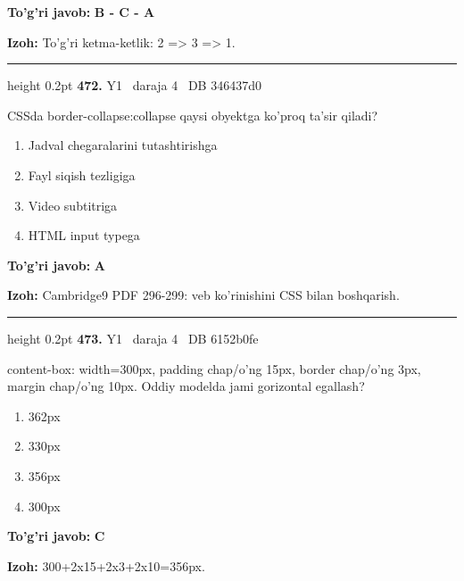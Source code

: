 \documentclass[10pt,a4paper,oneside]{article}
\begin{document}
\begin{tcolorbox}[enhanced,breakable,colback=teal!4,colframe=teal!45!black,boxrule=0.45pt,arc=1.2mm,left=2.8mm,right=2.8mm,top=2mm,bottom=2mm,before skip=2mm,after skip=2mm]
\textbf{\color{teal}To'g'ri javob:} \textbf{B - C - A}
\par\smallskip
\textbf{Izoh:} To'g'ri ketma-ketlik: 2 =\textgreater{} 3 =\textgreater{} 1.
\end{tcolorbox}
\vspace{2mm}\hrule height 0.2pt \vspace{4mm}
\hypertarget{q472}{\textbf{\color{ink}472.}}  {\color{muted}\scriptsize Y1 \textbullet\ daraja 4 \textbullet\ DB 346437d0}
\par
CSSda border-collapse:collapse qaysi obyektga ko'proq ta'sir qiladi?
\begin{enumerate}[label=\Alph*),leftmargin=9mm]
\item Jadval chegaralarini tutashtirishga
\item Fayl siqish tezligiga
\item Video subtitriga
\item HTML input typega
\end{enumerate}
\begin{tcolorbox}[enhanced,breakable,colback=teal!4,colframe=teal!45!black,boxrule=0.45pt,arc=1.2mm,left=2.8mm,right=2.8mm,top=2mm,bottom=2mm,before skip=2mm,after skip=2mm]
\textbf{\color{teal}To'g'ri javob:} \textbf{A}
\par\smallskip
\textbf{Izoh:} Cambridge9 PDF 296-299: veb ko'rinishini CSS bilan boshqarish.
\end{tcolorbox}
\vspace{2mm}\hrule height 0.2pt \vspace{4mm}
\hypertarget{q473}{\textbf{\color{ink}473.}}  {\color{muted}\scriptsize Y1 \textbullet\ daraja 4 \textbullet\ DB 6152b0fe}
\par
content-box: width=300px, padding chap/o'ng 15px, border chap/o'ng 3px, margin chap/o'ng 10px. Oddiy modelda jami gorizontal egallash?
\begin{enumerate}[label=\Alph*),leftmargin=9mm]
\item 362px
\item 330px
\item 356px
\item 300px
\end{enumerate}
\begin{tcolorbox}[enhanced,breakable,colback=teal!4,colframe=teal!45!black,boxrule=0.45pt,arc=1.2mm,left=2.8mm,right=2.8mm,top=2mm,bottom=2mm,before skip=2mm,after skip=2mm]
\textbf{\color{teal}To'g'ri javob:} \textbf{C}
\par\smallskip
\textbf{Izoh:} 300+2x15+2x3+2x10=356px.
\end{tcolorbox}
\end{document}
